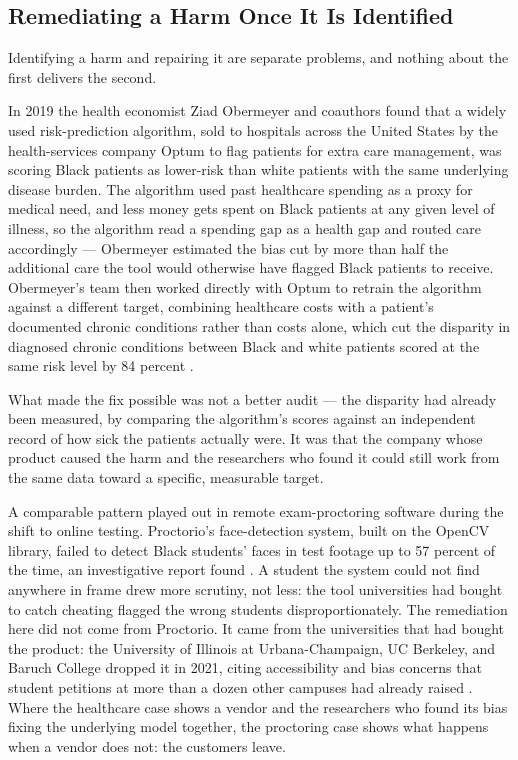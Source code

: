 \subsection{Remediating a Harm Once It Is Identified}
\label{sec:6.3.4}
Identifying a harm and repairing it are separate problems, and nothing about the first delivers the second.

In 2019 the health economist Ziad Obermeyer and coauthors found that a widely used risk-prediction algorithm, sold to hospitals across the United States by the health-services company Optum to flag patients for extra care management, was scoring Black patients as lower-risk than white patients with the same underlying disease burden. The algorithm used past healthcare spending as a proxy for medical need, and less money gets spent on Black patients at any given level of illness, so the algorithm read a spending gap as a health gap and routed care accordingly — Obermeyer estimated the bias cut by more than half the additional care the tool would otherwise have flagged Black patients to receive. Obermeyer's team then worked directly with Optum to retrain the algorithm against a different target, combining healthcare costs with a patient's documented chronic conditions rather than costs alone, which cut the disparity in diagnosed chronic conditions between Black and white patients scored at the same risk level by 84 percent \autocite{obermeyer2019dissecting}.

What made the fix possible was not a better audit — the disparity had already been measured, by comparing the algorithm's scores against an independent record of how sick the patients actually were. It was that the company whose product caused the harm and the researchers who found it could still work from the same data toward a specific, measurable target.

A comparable pattern played out in remote exam-proctoring software during the shift to online testing. Proctorio's face-detection system, built on the OpenCV library, failed to detect Black students' faces in test footage up to 57 percent of the time, an investigative report found \autocite{feathers2021proctorio}. A student the system could not find anywhere in frame drew more scrutiny, not less: the tool universities had bought to catch cheating flagged the wrong students disproportionately. The remediation here did not come from Proctorio. It came from the universities that had bought the product: the University of Illinois at Urbana-Champaign, UC Berkeley, and Baruch College dropped it in 2021, citing accessibility and bias concerns that student petitions at more than a dozen other campuses had already raised \autocite{flaherty2021illinois}. Where the healthcare case shows a vendor and the researchers who found its bias fixing the underlying model together, the proctoring case shows what happens when a vendor does not: the customers leave.

